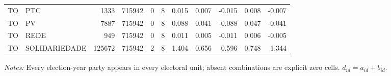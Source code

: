 \begin{landscape}
\begin{longtable}{llrrrrrrrrr}
TO & PTC & 1333 & 715942 & 0 & 8 & 0.015 & 0.007 & -0.015 & 0.008 & -0.007 \\
TO & PV & 7887 & 715942 & 0 & 8 & 0.088 & 0.041 & -0.088 & 0.047 & -0.041 \\
TO & REDE & 949 & 715942 & 0 & 8 & 0.011 & 0.005 & -0.011 & 0.006 & -0.005 \\
TO & SOLIDARIEDADE & 125672 & 715942 & 2 & 8 & 1.404 & 0.656 & 0.596 & 0.748 & 1.344 \\
\end{longtable}
\noindent\footnotesize\textit{Notes:} Every election-year party appears in every electoral unit; absent combinations are explicit zero cells. \(d_{id}=a_{id}+b_{id}\).
\endgroup
\end{landscape}
